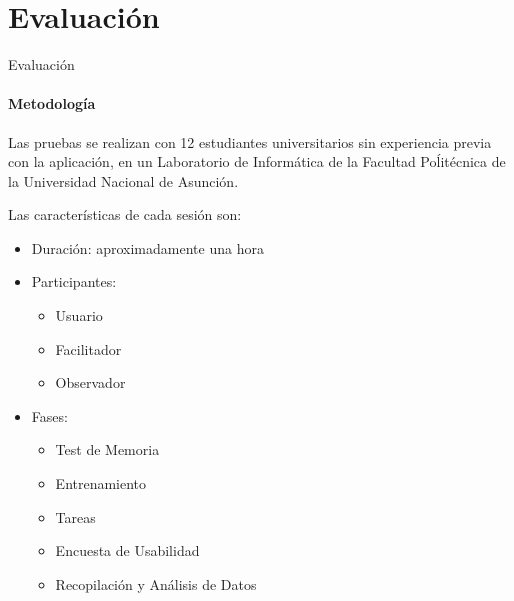\section{Evaluaci\'on}

\begin{frame}{Evaluaci\'on}
\framesubtitle{Metodolog\'ia}

Las pruebas se realizan con 12 estudiantes universitarios sin experiencia previa 
con la aplicaci\'on, en un Laboratorio de Inform\'atica de la Facultad Poĺit\'ecnica de 
la Universidad Nacional de Asunci\'on.

Las características de cada sesión son:
\begin{itemize}
    \item Duración: aproximadamente una hora
    \item Participantes:
        \begin{itemize}
            \item Usuario
            \item Facilitador
            \item Observador
        \end{itemize}
    \item Fases:
        \begin{itemize}
            \item Test de Memoria
            \item Entrenamiento
            \item Tareas
            \item Encuesta de Usabilidad
            \item Recopilación y Análisis de Datos
        \end{itemize}   
\end{itemize}
\end{frame}


